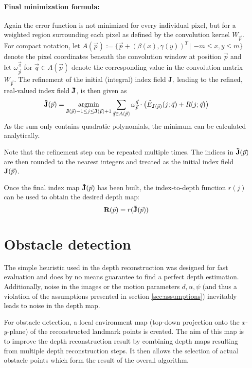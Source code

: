 \paragraph{Final minimization formula:} Again the error function is not minimized for every individual pixel, but for a weighted region surrounding each pixel as defined by the convolution kernel $W_{\vec p}$. For compact notation, let $A(\vec p) := \{\vec p + (\beta(x), \gamma(y))^T \mid -m \leq x, y \leq m\}$ denote the pixel coordinates beneath the convolution window at position $\vec p$ and let $\omega_{\vec p}^{\vec q}$ for $\vec q \in A(\vec p)$ denote the corresponding value in the convolution matrix $W_{\vec p}$. The refinement of the initial (integral) index field $\mathbf{J}$, leading to the refined, real-valued index field $\mathbf{\tilde J}$, is then given as
\begin{equation}
 \img{\tilde J}(\vec p) = \argmin_{\img{J}(\vec p) - 1 \leq j \leq \img{J}(\vec p) + 1} \sum_{\vec q \in A(\vec p)} \omega_{\vec p}^{\vec q} \cdot \left(\tilde E_{\img{J}(\vec p)}(j; \vec q) + R(j; \vec q) \right)
 \label{eqn:index_field_refinement}
\end{equation}
As the sum only contains quadratic polynomials, the minimum can be calculated analytically.

Note that the refinement step can be repeated multiple times. The indices in $\img{\tilde J}(\vec p)$ are then rounded to the nearest integers and treated as the initial index field $\img{J}(\vec p)$.

Once the final index map $\img{\tilde J}(\vec p)$ has been built, the index-to-depth function $r(j)$ can be used to obtain the desired depth map:
  $$\img{R}(\vec p) = r(\img{\tilde J}(\vec p))$$


\section{Obstacle detection}

The simple heuristic used in the depth reconstruction was designed for fast evaluation and does by no means guarantee to find a perfect depth estimation. Additionally, noise in the images or the motion parameters $d, \alpha, \psi$ (and thus a violation of the assumptions presented in section \ref{sec:assumptions}) inevitably leads to noise in the depth map.

For obstacle detection, a local environment map (top-down projection onto the $x$-$y$-plane) of the reconstructed landmark points is created. The aim of this map is to improve the depth reconstruction result by combining depth maps resulting from multiple depth reconstruction steps. It then allows the selection of actual obstacle points which form the result of the overall algorithm.

